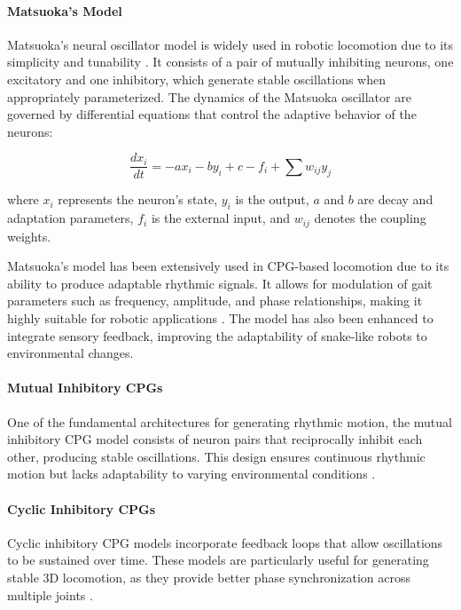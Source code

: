 \documentclass[12pt,a4paper]{report}
\begin{document}
\paragraph{Matsuoka’s Model}
Matsuoka’s neural oscillator model is widely used in robotic locomotion due to its simplicity and tunability \cite{matsuoka1985sustained}. It consists of a pair of mutually inhibiting neurons, one excitatory and one inhibitory, which generate stable oscillations when appropriately parameterized. The dynamics of the Matsuoka oscillator are governed by differential equations that control the adaptive behavior of the neurons:

\begin{equation}
\frac{d x_i}{d t} = -a x_i - b y_i + c - f_i + \sum w_{ij} y_j
\end{equation}

where \( x_i \) represents the neuron’s state, \( y_i \) is the output, \( a \) and \( b \) are decay and adaptation parameters, \( f_i \) is the external input, and \( w_{ij} \) denotes the coupling weights.

Matsuoka’s model has been extensively used in CPG-based locomotion due to its ability to produce adaptable rhythmic signals. It allows for modulation of gait parameters such as frequency, amplitude, and phase relationships, making it highly suitable for robotic applications \cite{ijspeert2008central}. The model has also been enhanced to integrate sensory feedback, improving the adaptability of snake-like robots to environmental changes.

\paragraph{Mutual Inhibitory CPGs}
One of the fundamental architectures for generating rhythmic motion, the mutual inhibitory CPG model consists of neuron pairs that reciprocally inhibit each other, producing stable oscillations. This design ensures continuous rhythmic motion but lacks adaptability to varying environmental conditions \cite{matsuoka1987mechanisms}.

\paragraph{Cyclic Inhibitory CPGs}
Cyclic inhibitory CPG models incorporate feedback loops that allow oscillations to be sustained over time. These models are particularly useful for generating stable 3D locomotion, as they provide better phase synchronization across multiple joints \cite{lu2006cyclic}.
\end{document}
